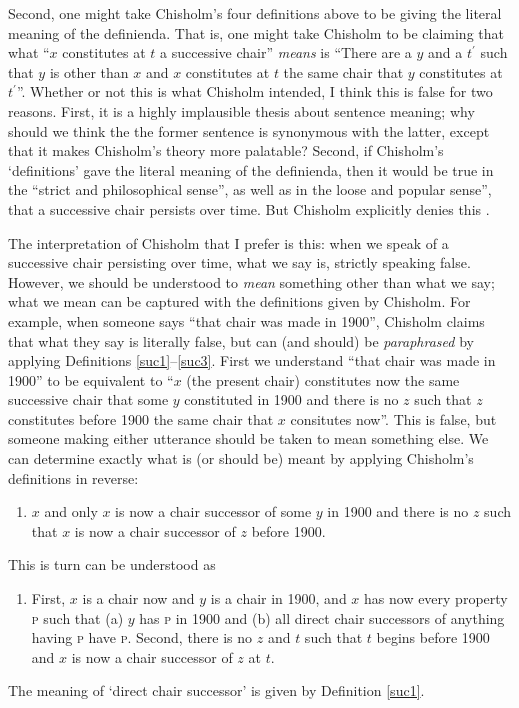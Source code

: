 \documentclass[11pt]{article}
\begin{document}
\begin{spacing}{1.5}
Second, one might take Chisholm's four definitions above to be giving
the literal meaning of the definienda.  That is, one might take
Chisholm to be claiming that what ``$x$ constitutes at $t$ a
successive chair'' {\em means} is ``There are a $y$ and a $t^{\prime}$
such that $y$ is other than $x$ and $x$ constitutes at $t$ the same
chair that $y$ constitutes at $t^{\prime}$''.  Whether or not this is
what Chisholm intended, I think this is false for two reasons.  First,
it is a highly implausible thesis about sentence meaning; why should
we think the the former sentence is synonymous with the latter, except
that it makes Chisholm's theory more palatable?  Second, if Chisholm's
`definitions' gave the literal meaning of the definienda, then it
would be true in the ``strict and philosophical sense'', as well as in
the loose and popular sense'', that a successive chair persists over
time.  But Chisholm explicitly denies this
\citeyearpar[96--97]{chisholm1979}.

The interpretation of Chisholm that I prefer is this: when we speak of
a successive chair persisting over time, what we say is, strictly
speaking false.  However, we should be understood to {\em mean}
something other than what we say; what we mean can be captured with
the definitions given by Chisholm.  For example, when someone says
``that chair was made in 1900'', Chisholm claims that what they say is
literally false, but can (and should) be {\em paraphrased} by applying
Definitions \ref{suc1}--\ref{suc3}.  First we understand ``that chair
was made in 1900'' to be equivalent to ``$x$ (the present chair)
constitutes now the same successive chair that some $y$ constituted in
1900 and there is no $z$ such that $z$ constitutes before 1900 the
same chair that $x$ consitutes now''.  This is false, but someone
making either utterance should be taken to mean something else.  We
can determine exactly what is (or should be) meant by applying
Chisholm's definitions in reverse:

\begin{enumerate}[start=3]
  \item $x$ and only $x$ is now a chair successor of some $y$ in 1900
    and there is no $z$ such that $x$ is now a chair successor of $z$
    before 1900.
\end{enumerate}
This is turn can be understood as

\begin{enumerate}[start=2]
  \item First, $x$ is a chair now and $y$ is a chair in 1900, and $x$
    has now every property \textsc{p} such that (a) $y$ has \textsc{p}
    in 1900 and (b) all direct chair successors of anything having
    \textsc{p} have \textsc{p}.  Second, there is no $z$ and $t$ such
    that $t$ begins before 1900 and $x$ is now a chair successor of
    $z$ at $t$.
\end{enumerate}
The meaning of `direct chair successor' is given by Definition
\ref{suc1}.


\end{spacing}
\end{document}

